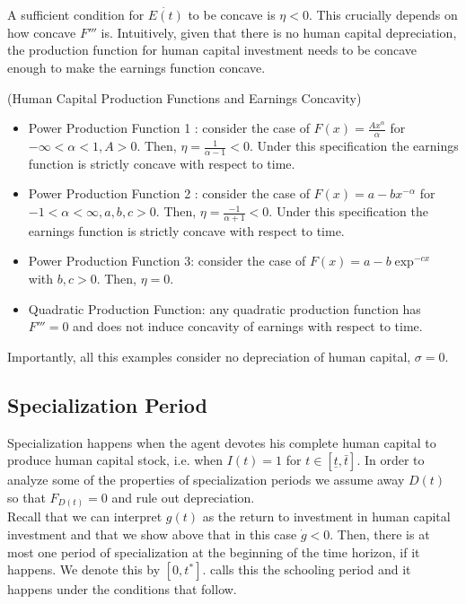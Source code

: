 \indent A sufficient condition for $\dot{E(t)}$ to be concave is $\eta < 0$. This crucially depends on how concave $F'''$ is. Intuitively, given that there is no human capital depreciation, the production function for human capital investment needs to be concave enough to make the earnings function concave.

\begin{example} (Human Capital Production Functions and Earnings Concavity)
\begin{itemize}
\item Power Production Function 1 : consider the case of $F(x) = \frac{Ax^{\alpha}}{\alpha}$ for $ - \infty < \alpha < 1, A > 0$. Then, $\eta = \frac{1}{\alpha - 1} < 0$. Under this specification the earnings function is strictly concave with respect to time.
\item Power Production Function 2 : consider the case of $F(x) = a - b x ^ {- \alpha}$ for $ - 1 < \alpha < \infty, a,b,c > 0$. Then, $\eta = \frac{-1}{\alpha + 1} < 0$. Under this specification the earnings function is strictly concave with respect to time.
\item Power Production Function 3: consider the case of $F(x) = a - b \exp^{-cx}$ with $b,c > 0$. Then, $\eta = 0$. 
\item Quadratic Production Function: any quadratic production function has $F''' = 0$ and does not induce concavity of earnings with respect to time. 
\end{itemize}
\noindent Importantly, all this examples consider no depreciation of human capital, $\sigma = 0$. 
\end{example} 

\subsection{Specialization Period}
Specialization happens when the agent devotes his complete human capital to produce human capital stock, i.e. when $I(t) = 1$ for $t \in [ \underline{t}, \bar{t}]$. In order to analyze some of the properties of specialization periods we assume away $D(t)$ so that $F_{D(t)} = 0$ and rule out depreciation.\\
\indent Recall that we can interpret $g(t)$ as the return to investment in human capital investment and that we show above that in this case $\dot{g} < 0$. Then, there is at most one period of specialization at the beginning of the time horizon, if it happens. We denote this by $[0,t^*]$. \citet{ben1967production} calls this the schooling period and it happens under the conditions that follow.

